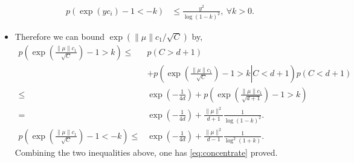 \documentclass{article} \usepackage{acl2017,times}
\newenvironment{proof}[1][Proof]{\begin{trivlist}
\item[\hskip \labelsep {\bfseries #1}]}{\end{trivlist}}
\begin{document}
\begin{proof}
\begin{itemize}
\begin{align*}
        p(\exp(yc_i) -1 < -k) &\le \frac{y^2}{\log (1-k)^2}, \ \forall k > 0.
    \end{align*}
    \item Therefore we can bound $\exp\left(\|\mu\|c_1 / \sqrt{C}\right)$ by,
    \begin{align*}
        p\left(\exp\left(\frac{\|\mu\|c_1}{ \sqrt{C}}\right) -1 > k \right) \le & p\left(C > d+1\right) \\
        & + p\left(\left.\exp\left(\frac{\|\mu\|c_1}{ \sqrt{C}}\right) -1 > k \right| C < d+1\right)p\left(C < d+1\right) \\
        \le & \exp\left(-\frac{1}{4d}\right) + p\left(\exp\left(\frac{\|\mu\|c_1}{ \sqrt{d+1}}\right) -1 > k \right) \\
        =& \exp\left(-\frac{1}{4d}\right) + \frac{\|\mu\|^2}{d+1}\frac{1}{\log(1-k)^2}. \\
        p\left(\exp\left(\frac{\|\mu\|c_1}{ \sqrt{C}}\right) -1 < -k \right) \le & \exp\left(-\frac{1}{4d}\right) + \frac{\|\mu\|^2}{d-1} \frac{1}{\log^2(1+k)}.
    \end{align*}
    Combining the two inequalities above, one has \eqref{eq:concentrate} proved.
\end{itemize}

\end{proof}
\end{document}
